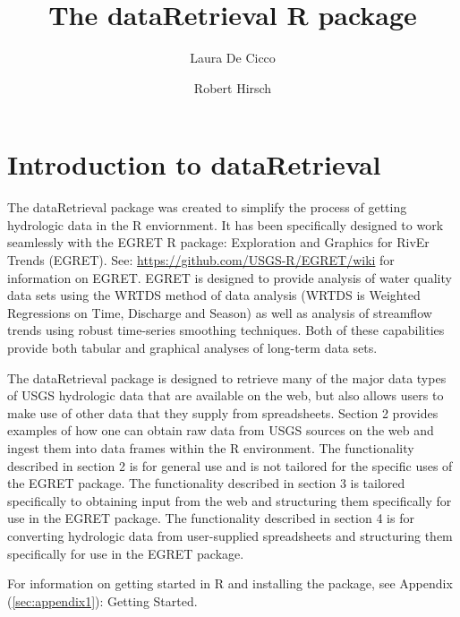 \documentclass[a4paper,11pt]{article}
\begin{document}


\title{The dataRetrieval R package}
\author[1]{Laura De Cicco}
\author[1]{Robert Hirsch}



\maketitle
\tableofcontents

\section{Introduction to dataRetrieval}
The dataRetrieval package was created to simplify the process of getting hydrologic data in the R enviornment. It has been specifically designed to work seamlessly with the EGRET R package: Exploration and Graphics for RivEr Trends (EGRET). See: \url{https://github.com/USGS-R/EGRET/wiki} for information on EGRET. EGRET is designed to provide analysis of water quality data sets using the WRTDS method of data analysis (WRTDS is Weighted Regressions on Time, Discharge and Season) as well as analysis of streamflow trends using robust time-series smoothing techniques.  Both of these capabilities provide both tabular and graphical analyses of long-term data sets.


The dataRetrieval package is designed to retrieve many of the major data types of USGS hydrologic data that are available on the web, but also allows users to make use of other data that they supply from spreadsheets.  Section 2 provides examples of how one can obtain raw data from USGS sources on the web and ingest them into data frames within the R environment.  The functionality described in section 2 is for general use and is not tailored for the specific uses of the EGRET package.  The functionality described in section 3 is tailored specifically to obtaining input from the web and structuring them specifically for use in the EGRET package.  The functionality described in section 4 is for converting hydrologic data from user-supplied spreadsheets and structuring them specifically for use in the EGRET package.

For information on getting started in R and installing the package, see Appendix (\ref{sec:appendix1}): Getting Started.
\end{document}
